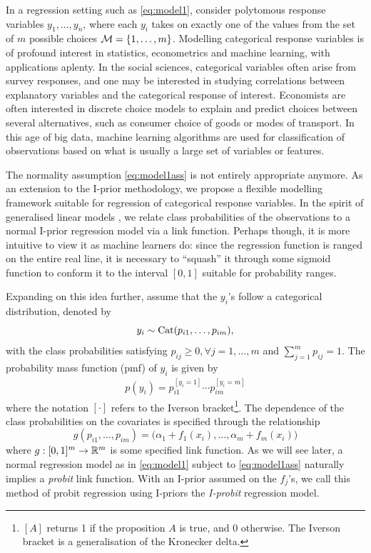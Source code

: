 \documentclass[a4paper,showframe,11pt]{report}
\begin{document}
\label{chapter5}

In a regression setting such as \cref{eq:model1}, consider polytomous response variables $y_1,\dots,y_n$, where each $y_i$ takes on exactly one of the values from the set of $m$ possible choices ${\mathcal M} = \{1,\dots,m\}$.
Modelling categorical response variables is of profound interest in statistics, econometrics and machine learning, with applications aplenty. 
In the social sciences, categorical variables often arise from survey responses, and one may be interested in studying correlations between  explanatory variables and the categorical response of interest.
Economists are often interested in discrete choice models to explain and predict choices between several alternatives, such as consumer choice of goods or modes of transport.
In this age of big data, machine learning algorithms are used for classification of observations based on what is usually a large set of variables or features.

The normality assumption \cref{eq:model1ass} is not entirely appropriate anymore.
As an extension to the I-prior methodology, we propose a flexible modelling framework suitable for regression of categorical response variables.
In the spirit of generalised linear models \citep{mccullagh1989}, we relate class probabilities of the observations to a normal I-prior regression model via a link function.
Perhaps though, it is more intuitive to view it as machine learners do: since the regression function is ranged on the entire real line, it is necessary to ``squash'' it through some sigmoid function to conform it to the interval $[0,1]$ suitable for probability ranges.

Expanding on this idea further, assume that the $y_i$'s follow a categorical distribution, denoted by
\[
  y_i \sim \operatorname{Cat}(p_{i1},\dots,p_{im}),
\]
with the class probabilities satisfying $p_{ij} \geq 0, \forall j=1,\dots,m$ and $\sum_{j=1}^m p_{ij} = 1$. 
The probability mass function (pmf) of $y_i$ is given by
\begin{align*}%
  p(y_i) = p_{i1}^{[y_i = 1]} \cdots p_{im}^{[y_i = m]}
\end{align*}
where the notation $[\cdot]$ refers to the Iverson bracket\footnote{$[A]$ returns 1 if the proposition $A$ is true, and 0 otherwise. The Iverson bracket is a generalisation of the Kronecker delta.}. 
The dependence of the class probabilities on the covariates is specified through the relationship
\[
  g(p_{i1},\dots,p_{im}) = \big(\alpha_1 + f_1(x_i), \dots, \alpha_m + f_m(x_i)\big)
\]
where $g:[0,1]^m\to\mathbb{R}^m$ is some specified link function.
As we will see later, a normal regression model as in \cref{eq:model1} subject to \cref{eq:model1ass} naturally implies a \emph{probit} link function.
With an I-prior assumed on the $f_j$'s, we call this method of probit regression using I-priors the \emph{I-probit} regression model.
\end{document}
